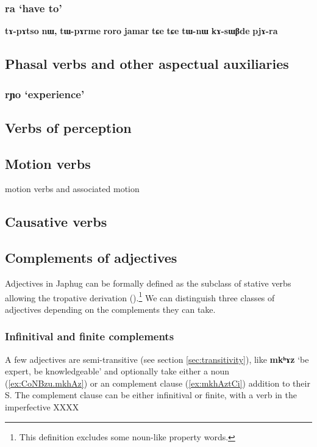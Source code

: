 \documentclass[oldfontcommands,oneside,a4paper,11pt]{article}
\newcommand{\ipa}[1]{\textbf{\phon#1}} %
\newcommand{\jpg}[2]{\ipa{#1} `#2'} %
\begin{document}
  \subsubsection{\jpg{ra}{have to}} \label{sec:ra}
  \ipa{tɤ-pɤtso} 	\ipa{nɯ,} 	\ipa{tɯ-pɤrme} 	\ipa{roro} 	\ipa{jamar} 	\ipa{tɕe} 	\ipa{tɕe} 	\ipa{tɯ-nɯ} 	\ipa{kɤ-sɯβde} 	\ipa{pjɤ-ra} 
  
  \subsection{Phasal verbs and other aspectual auxiliaries}
\subsubsection{\jpg{rɲo}{experience}}   \label{sec:rɲo}

   \subsection{Verbs of perception}
  
  \subsection{Motion verbs}
  
motion verbs and associated motion   \citet{jacques13harmonization}
  
\subsection{Causative verbs}



\subsection{Complements of adjectives} \label{sec:adj}
Adjectives in Japhug can be formally defined as the subclass of stative verbs allowing the tropative derivation (\citealt{jacques13tropative}).\footnote{This definition excludes some noun-like property words.} We can distinguish three classes of adjectives depending on the complements they can take.


\subsubsection{Infinitival and finite complements}
A few adjectives are semi-transitive (see section \ref{sec:transitivity}), like \jpg{mkʰɤz}{be expert, be knowledgeable} and optionally take either a noun (\ref{ex:CoNBzu.mkhAz}) or an complement clause (\ref{ex:mkhAztCi}) addition to their S. The complement clause can be either infinitival or finite, with a verb in the imperfective XXXX
\end{document}
